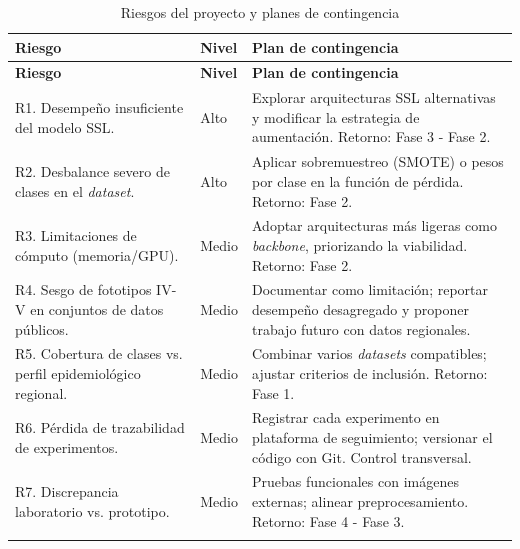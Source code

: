 \begingroup
\small
\singlespacing
\setlength{\tabcolsep}{4pt}
\begin{longtable}{@{}>{\raggedright\arraybackslash}p{}>{\raggedright\arraybackslash}p{}>{\raggedright\arraybackslash}p{}@{}}
\caption{Riesgos del proyecto y planes de contingencia}\label{tab:riesgos-proyecto}\\
\toprule
\textbf{Riesgo} & \textbf{Nivel} & \textbf{Plan de contingencia} \\
\midrule
\endfirsthead
\toprule
\textbf{Riesgo} & \textbf{Nivel} & \textbf{Plan de contingencia} \\
\midrule
\endhead
\bottomrule
\endfoot
R1. Desempeño insuficiente del modelo SSL. & Alto & Explorar arquitecturas SSL alternativas y modificar la estrategia de aumentación. Retorno: Fase 3 - Fase 2. \\
\addlinespace
R2. Desbalance severo de clases en el \textit{dataset}. & Alto & Aplicar sobremuestreo (SMOTE) o pesos por clase en la función de pérdida. Retorno: Fase 2. \\
\addlinespace
R3. Limitaciones de cómputo (memoria/GPU). & Medio & Adoptar arquitecturas más ligeras como \textit{backbone}, priorizando la viabilidad. Retorno: Fase 2. \\
\addlinespace
R4. Sesgo de fototipos IV-V en conjuntos de datos públicos. & Medio & Documentar como limitación; reportar desempeño desagregado y proponer trabajo futuro con datos regionales. \\
\addlinespace
R5. Cobertura de clases vs. perfil epidemiológico regional. & Medio & Combinar varios \textit{datasets} compatibles; ajustar criterios de inclusión. Retorno: Fase 1. \\
\addlinespace
R6. Pérdida de trazabilidad de experimentos. & Medio & Registrar cada experimento en plataforma de seguimiento; versionar el código con Git. Control transversal. \\
\addlinespace
R7. Discrepancia laboratorio vs. prototipo. & Medio & Pruebas funcionales con imágenes externas; alinear preprocesamiento. Retorno: Fase 4 - Fase 3. \\
\addlinespace
\end{longtable}
\endgroup
{\footnotesize\singlespacing
\par{}
}

